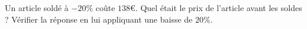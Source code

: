 
\begin{exercice}\label{exosmath-0040}

    Un article soldé à \( -20\%\) coûte \( 138\)€. Quel était le prix de l'article avant les soldes ? Vérifier la réponse en lui appliquant une baisse de \( 20\%\).

\end{exercice}
